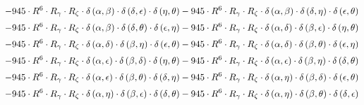 \begin{subequations}
\begin{gather}
 \\[0.2em] \notag 		 - 945 \cdot R^{6} \cdot R_{\gamma{}} \cdot R_{\zeta{}} \cdot \delta{}\left(\alpha{}, \beta{}\right) \cdot \delta{}\left(\delta{}, \epsilon{}\right) \cdot \delta{}\left(\eta{}, \theta{}\right)- 945 \cdot R^{6} \cdot R_{\gamma{}} \cdot R_{\zeta{}} \cdot \delta{}\left(\alpha{}, \beta{}\right) \cdot \delta{}\left(\delta{}, \eta{}\right) \cdot \delta{}\left(\epsilon{}, \theta{}\right) 
 \\[0.2em] \notag 		 - 945 \cdot R^{6} \cdot R_{\gamma{}} \cdot R_{\zeta{}} \cdot \delta{}\left(\alpha{}, \beta{}\right) \cdot \delta{}\left(\delta{}, \theta{}\right) \cdot \delta{}\left(\epsilon{}, \eta{}\right)- 945 \cdot R^{6} \cdot R_{\gamma{}} \cdot R_{\zeta{}} \cdot \delta{}\left(\alpha{}, \delta{}\right) \cdot \delta{}\left(\beta{}, \epsilon{}\right) \cdot \delta{}\left(\eta{}, \theta{}\right) 
 \\[0.2em] \notag 		 - 945 \cdot R^{6} \cdot R_{\gamma{}} \cdot R_{\zeta{}} \cdot \delta{}\left(\alpha{}, \delta{}\right) \cdot \delta{}\left(\beta{}, \eta{}\right) \cdot \delta{}\left(\epsilon{}, \theta{}\right)- 945 \cdot R^{6} \cdot R_{\gamma{}} \cdot R_{\zeta{}} \cdot \delta{}\left(\alpha{}, \delta{}\right) \cdot \delta{}\left(\beta{}, \theta{}\right) \cdot \delta{}\left(\epsilon{}, \eta{}\right) 
 \\[0.2em] \notag 		 - 945 \cdot R^{6} \cdot R_{\gamma{}} \cdot R_{\zeta{}} \cdot \delta{}\left(\alpha{}, \epsilon{}\right) \cdot \delta{}\left(\beta{}, \delta{}\right) \cdot \delta{}\left(\eta{}, \theta{}\right)- 945 \cdot R^{6} \cdot R_{\gamma{}} \cdot R_{\zeta{}} \cdot \delta{}\left(\alpha{}, \epsilon{}\right) \cdot \delta{}\left(\beta{}, \eta{}\right) \cdot \delta{}\left(\delta{}, \theta{}\right) 
 \\[0.2em] \notag 		 - 945 \cdot R^{6} \cdot R_{\gamma{}} \cdot R_{\zeta{}} \cdot \delta{}\left(\alpha{}, \epsilon{}\right) \cdot \delta{}\left(\beta{}, \theta{}\right) \cdot \delta{}\left(\delta{}, \eta{}\right)- 945 \cdot R^{6} \cdot R_{\gamma{}} \cdot R_{\zeta{}} \cdot \delta{}\left(\alpha{}, \eta{}\right) \cdot \delta{}\left(\beta{}, \delta{}\right) \cdot \delta{}\left(\epsilon{}, \theta{}\right) 
 \\[0.2em] \notag 		 - 945 \cdot R^{6} \cdot R_{\gamma{}} \cdot R_{\zeta{}} \cdot \delta{}\left(\alpha{}, \eta{}\right) \cdot \delta{}\left(\beta{}, \epsilon{}\right) \cdot \delta{}\left(\delta{}, \theta{}\right)- 945 \cdot R^{6} \cdot R_{\gamma{}} \cdot R_{\zeta{}} \cdot \delta{}\left(\alpha{}, \eta{}\right) \cdot \delta{}\left(\beta{}, \theta{}\right) \cdot \delta{}\left(\delta{}, \epsilon{}\right) 

\end{gather}
\end{subequations}
